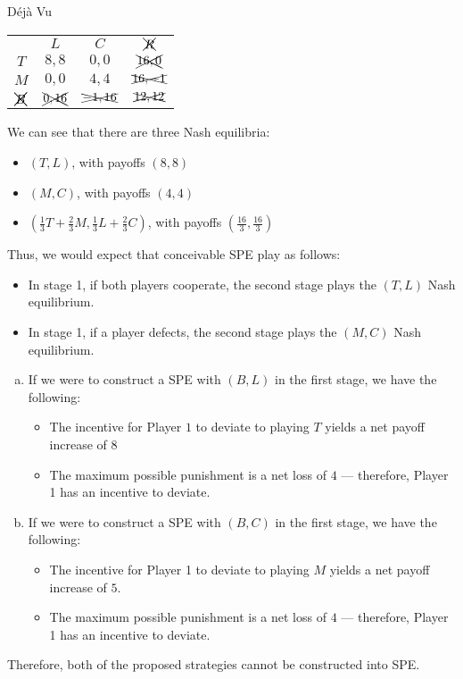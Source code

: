 \documentclass[8pt]{extarticle}
\begin{document}
\begin{problem}{Déjà Vu}
    \begin{center}
      \begin{tabular}{c|c|c|c|}
        \multicolumn{1}{c}{} & \multicolumn{1}{c}{$L$} & \multicolumn{1}{c}{$C$} & \multicolumn{1}{c}{$\xcancel{R}$}\\
        \cline{2-4}
        $T$ & $8,8$ & $0,0$ & $\xcancel{16,0}$\\
        \cline{2-4}
        $M$ & $0,0$ & $4,4$ & $\xcancel{16,-1}$\\
        \cline{2-4}
        $\xcancel{B}$ & $\xcancel{0,16}$ & $\xcancel{-1,16}$ & $\xcancel{12,12}$\\
        \cline{2-4}
      \end{tabular}
    \end{center}
    We can see that there are three Nash equilibria:
    \begin{itemize}
      \item $(T,L)$, with payoffs $(8,8)$
      \item $(M,C)$, with payoffs $(4,4)$
      \item $\displaystyle \left(\frac{1}{3}T + \frac{2}{3}M,\frac{1}{3}L + \frac{2}{3}C\right)$, with payoffs $\displaystyle\left(\frac{16}{3},\frac{16}{3}\right)$
    \end{itemize}
    Thus, we would expect that conceivable SPE play as follows:
    \begin{itemize}
      \item In stage 1, if both players cooperate, the second stage plays the $(T,L)$ Nash equilibrium.
      \item In stage 1, if a player defects, the second stage plays the $(M,C)$ Nash equilibrium.
    \end{itemize}
    \begin{enumerate}[(a)]
      \item If we were to construct a SPE with $(B,L)$ in the first stage, we have the following:
        \begin{itemize}
          \item The incentive for Player $1$ to deviate to playing $T$ yields a net payoff increase of $8$
          \item The maximum possible punishment is a net loss of $4$ --- therefore, Player 1 has an incentive to deviate.
        \end{itemize}
      \item If we were to construct a SPE with $(B,C)$ in the first stage, we have the following:
        \begin{itemize}
          \item The incentive for Player 1 to deviate to playing $M$ yields a net payoff increase of $5$.
          \item The maximum possible punishment is a net loss of $4$ --- therefore, Player 1 has an incentive to deviate.
        \end{itemize}
    \end{enumerate}
    Therefore, both of the proposed strategies cannot be constructed into SPE.
  \end{problem}
\end{document}
